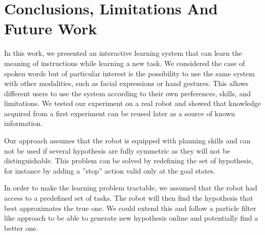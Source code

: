 \section{Conclusions, Limitations And Future Work}
\label{sec:LimitationAndFutureWork}
%
In this work, we presented an interactive learning system that can learn the meaning of instructions while learning a new task. We considered the case of spoken words but of particular interest is the possibility to use the same system with other modalities, such as facial expressions or hand gestures. This allows different users to use the system according to their own preferences, skills, and limitations. We tested our experiment on a real robot and showed that knowledge acquired from a first experiment can be reused later as a source of known information. 

Our approach assumes that the robot is equipped with planning skills and can not be used if several hypothesis are fully symmetric as they will not be distinguishable. This problem can be solved by redefining the set of hypothesis, for instance by adding a ''stop'' action valid only at the goal states. 

In order to make the learning problem tractable, we assumed that the robot had access to a predefined set of tasks. The robot will then find the hypothesis that best approximates the true one. We could extend this and follow a particle filter like approach to be able to generate new hypothesis online and potentially find a better one.

